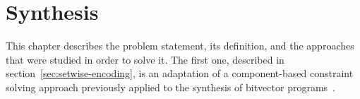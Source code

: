 \chapter{Synthesis}
\label{chap:synthesis}

This chapter describes the problem statement, its definition, and the approaches
that were studied in order to solve it. The first one, described in
section~\ref{sec:setwise-encoding}, is an adaptation of a component-based
constraint solving approach previously applied to the synthesis of bitvector
programs~\cite{Gulwani:2011:SLP, Jha:oracle:2010}.





